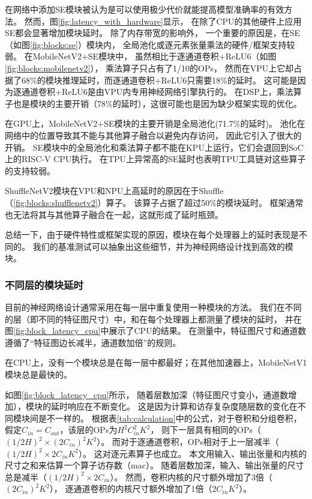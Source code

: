 在网络中添加SE模块被认为是可以使用极少代价就能提高模型准确率的有效方法。
然而，图\ref{fig:latency_with_hardware}显示，
在除了CPU的其他硬件上应用SE都会显著增加模块延时。
除了内存带宽的影响外，
一个重要的原因是，在SE（如图\ref{fig:blocks:se}）模块内，
全局池化或逐元素张量乘法的硬件/框架支持较弱。
在MobileNetV2+SE模块中，
虽然相比于逐通道卷积+ReLU6（如图\ref{fig:blocks:mobilenetv2}），
乘法算子只占有了1/10的OPs，
然而在VPU上它却占据了68\%的模块推理延时，而逐通道卷积+ReLU6只需要18\%的延时。
这可能是因为逐通道卷积+ReLU6是由VPU内专用神经网络引擎执行的。
在DSP上，乘法算子也是模块的主要开销（78\%的延时），这很可能也是因为缺少框架实现的优化。

在GPU上，MobileNetV2+SE模块的主要开销是全局池化(71.7\%的延时)。
池化在网络中的位置导致其不能与其他算子融合以避免内存访问，
因此它引入了很大的开销。
SE模块中的全局池化和乘法算子都不能在KPU上运行，它们会退回到SoC上的RISC-V CPU执行。
在TPU上异常高的SE延时也表明TPU工具链对这些算子的支持较弱。

ShuffleNetV2模块在VPU和NPU上高延时的原因在于Shuffle（\ref{fig:blocks:shufflenetv2}）算子。
该算子占据了超过50\%的模块延时。
框架通常也无法将其与其他算子融合在一起，这就形成了延时瓶颈。

总结一下，由于硬件特性或框架实现的原因，模块在每个处理器上的延时表现是不同的。
我们的基准测试可以抽象出这些细节，并为神经网络设计找到高效的模块。

\subsubsection{不同层的模块延时}
\label{analysis:op block:block with layer}


目前的神经网络设计通常采用在每一层中重复使用一种模块的方法。
我们在不同的层（即不同的特征图尺寸）中，和在每个处理器上都测量了模块的延时，
并在图\ref{fig:block_latency_cpu}中展示了CPU的结果。
在测量中，特征图尺寸和通道数遵循了``特征图边长减半，通道数加倍''的规则。

\begin{finding}
    在CPU上，没有一个模块总是在每一层中都最好；在其他加速器上，MobileNetV1模块总是最快的。
\end{finding}

如图\ref{fig:block_latency_cpu}所示，
随着层数加深（特征图尺寸变小，通道数增加），模块的延时响应在不断变化。
这是因为计算和访存复杂度随层数的变化在不同模块间是不一样的。
根据表\ref{tab:calculation}中的公式，对于卷积和分组卷积，
假定$C_{in}=C_{out}$，该层的OPs为$H^2C_{in}^2K^2$，
则下一层具有相同的OPs（$(1/2H)^2\times (2C_{in})^2K^2$）。
而对于逐通道卷积，OPs相对于上一层减半（$(1/2H)^2\times 2C_{in}K^2$）。
这对逐元素算子也成立。
本文用输入、输出张量和内核的尺寸之和来估算一个算子访存数（mac）。
随着层数加深，输入、输出张量的尺寸总是减半（$(1/2H)^2\times 2C_{in}$）。
然而，卷积内核的尺寸额外增加了3倍（$(2 C_{in})^2K^2$），
逐通道卷积的内核尺寸额外增加了1倍（$2 C_{in}K^2$）。

